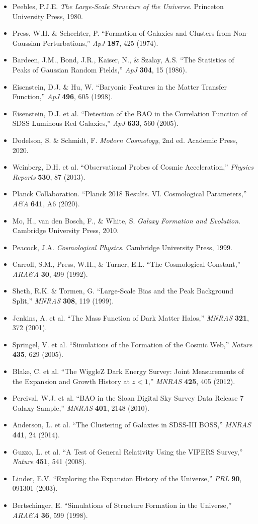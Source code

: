 \documentclass[a4paper, 11pt]{article}
\begin{document}
\begin{itemize}
\item Peebles, P.J.E. \textit{The Large-Scale Structure of the Universe}. Princeton University Press, 1980.
\item Press, W.H. \& Schechter, P. ``Formation of Galaxies and Clusters from Non-Gaussian
Perturbations,'' \textit{ApJ} \textbf{187}, 425 (1974).
\item Bardeen, J.M., Bond, J.R., Kaiser, N., \& Szalay, A.S. ``The Statistics of Peaks of
Gaussian Random Fields,'' \textit{ApJ} \textbf{304}, 15 (1986).
\item Eisenstein, D.J. \& Hu, W. ``Baryonic Features in the Matter Transfer Function,''
\textit{ApJ} \textbf{496}, 605 (1998).
\item Eisenstein, D.J. et al. ``Detection of the BAO in the Correlation Function of SDSS
Luminous Red Galaxies,'' \textit{ApJ} \textbf{633}, 560 (2005).
\item Dodelson, S. \& Schmidt, F. \textit{Modern Cosmology}, 2nd ed. Academic Press, 2020.
\item Weinberg, D.H. et al. ``Observational Probes of Cosmic Acceleration,''
\textit{Physics Reports} \textbf{530}, 87 (2013).
\item Planck Collaboration. ``Planck 2018 Results. VI. Cosmological Parameters,''
\textit{A\&A} \textbf{641}, A6 (2020).
\item Mo, H., van den Bosch, F., \& White, S. \textit{Galaxy Formation and Evolution}.
Cambridge University Press, 2010.
\item Peacock, J.A. \textit{Cosmological Physics}. Cambridge University Press, 1999.
\item Carroll, S.M., Press, W.H., \& Turner, E.L. ``The Cosmological Constant,''
\textit{ARA\&A} \textbf{30}, 499 (1992).
\item Sheth, R.K. \& Tormen, G. ``Large-Scale Bias and the Peak Background Split,''
\textit{MNRAS} \textbf{308}, 119 (1999).
\item Jenkins, A. et al. ``The Mass Function of Dark Matter Halos,'' \textit{MNRAS}
\textbf{321}, 372 (2001).
\item Springel, V. et al. ``Simulations of the Formation of the Cosmic Web,'' \textit{Nature}
\textbf{435}, 629 (2005).
\item Blake, C. et al. ``The WiggleZ Dark Energy Survey: Joint Measurements of the Expansion
and Growth History at $z < 1$,'' \textit{MNRAS} \textbf{425}, 405 (2012).
\item Percival, W.J. et al. ``BAO in the Sloan Digital Sky Survey Data Release 7 Galaxy
Sample,'' \textit{MNRAS} \textbf{401}, 2148 (2010).
\item Anderson, L. et al. ``The Clustering of Galaxies in SDSS-III BOSS,'' \textit{MNRAS}
\textbf{441}, 24 (2014).
\item Guzzo, L. et al. ``A Test of General Relativity Using the VIPERS Survey,'' \textit{Nature}
\textbf{451}, 541 (2008).
\item Linder, E.V. ``Exploring the Expansion History of the Universe,'' \textit{PRL}
\textbf{90}, 091301 (2003).
\item Bertschinger, E. ``Simulations of Structure Formation in the Universe,''
\textit{ARA\&A} \textbf{36}, 599 (1998).
\end{itemize}
\end{document}
